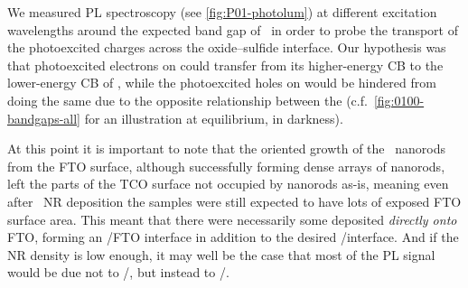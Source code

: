 \documentclass[draft,webedition,openright,titles,swedish,english]{LuaUUThesis}\usepackage[]{graphicx}\usepackage[]{xcolor}
\newcommand{\cf}{c.f.}
\begin{document}
We measured \Gls{PL} spectroscopy (see \cref{fig:P01-photolum}) at different
excitation wavelengths around the expected band gap of \ZnO\ in order to
probe the transport of the photoexcited charges across the oxide--sulfide
interface.
Our hypothesis was that photoexcited electrons on  could transfer from
its higher-energy \gls{CB} to the lower-energy \gls{CB} of \ZnO, while the
photoexcited holes on  would be hindered from doing the same due to
the opposite relationship between the 
(\cf\ \cref{fig:0100-bandgaps-all} for an illustration at equilibrium, in darkness).

At this point it is important to note that the oriented growth of the
\ZnO\ nanorods from the \gls{FTO} surface, although successfully forming
dense arrays of nanorods, left the parts of the \gls{TCO} surface not occupied
by nanorods as-is, meaning even after \ZnO\ \gls{NR} deposition the samples
were still expected to have lots of exposed \gls{FTO} surface area.
This meant that there were necessarily some  deposited \emph{directly onto} \gls{FTO},
forming an /\gls{FTO} interface in addition to the desired /\ZnO interface.
And if the  \gls{NR} density is low enough, it may well
be the case that most of the \gls{PL} signal would be due not to /,
but instead to /.


%
\end{document}
